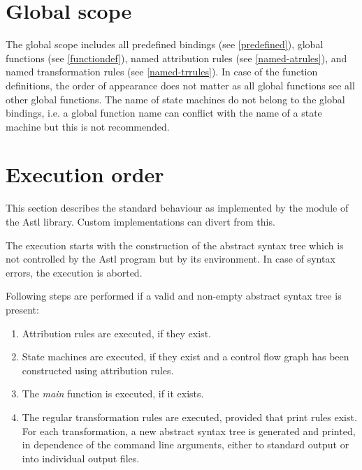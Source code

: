 \section{Global scope}

The global scope includes all predefined bindings (see \ref{predefined}),
global functions (see \ref{functiondef}), named attribution rules
(see \ref{named-atrules}), and named transformation rules (see
\ref{named-trrules}). In case of the function definitions, the order
of appearance does not matter as all global functions see all other
global functions.  The name of state machines do not belong to the global
bindings, i.e. a global function name can conflict with the name of a
state machine but this is not recommended.

\section{Execution order}\label{xorder}

This section describes the standard behaviour as implemented by
the  module of the Astl library. Custom implementations
can divert from this.

The execution starts with the construction of the abstract syntax tree
which is not controlled by the Astl program but by its environment.
In case of syntax errors, the execution is aborted.

Following steps are performed if a valid and non-empty
abstract syntax tree is present:

\begin{enumerate}
   \item Attribution rules are executed, if they exist.
   \item State machines are executed, if they exist and a control flow
      graph has been constructed using attribution rules.
   \item The \textit{main} function is executed, if it exists.
   \item The regular transformation rules are executed, provided
      that print rules exist.
      For each transformation, a new abstract syntax tree is generated
      and printed, in dependence of the command line arguments, either
      to standard output or into individual output files.
\end{enumerate}

\endinput
